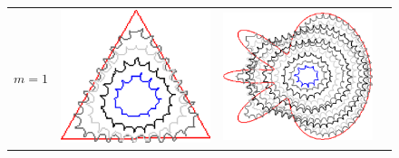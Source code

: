 \begin{figure}
\center
\begin{tabular}{p{3em}ccc}
$m=1$ & \includegraphics[scale=0.25]{figures/chapter6/level-effect/triangle/improve/len_pen0/radius-9/level1/summary.pdf} &
\includegraphics[scale=0.25]{figures/chapter6/level-effect/flower/improve/len_pen0/radius-9/level1/summary.pdf} &

\end{tabular}
\end{figure}
